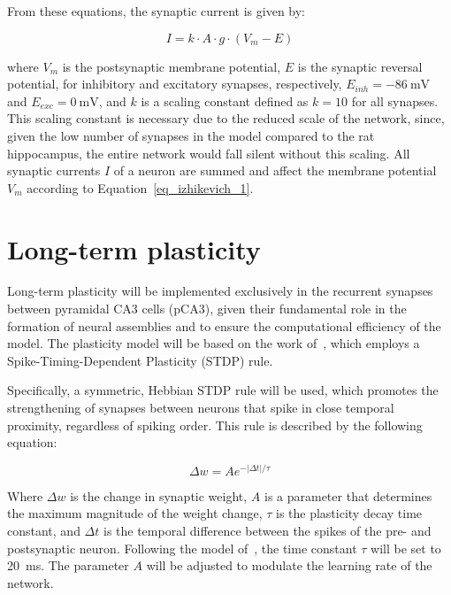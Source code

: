 From these equations, the synaptic current is given by:

\begin{equation}
    \label{eq_tsodyks_I}
    I = k \cdot A \cdot g \cdot (V_m - E)
\end{equation}

where $V_m$ is the postsynaptic membrane potential, $E$ is the synaptic reversal potential, for inhibitory and excitatory
synapses, respectively, $E_{inh} = \SI{-86}{\milli\volt}$ and $E_{exc} = \SI{0}{\milli\volt}$, and $k$ is a scaling constant
defined as $k = 10$ for all synapses. This scaling constant is necessary due to the reduced scale of the network, since, given
the low number of synapses in the model compared to the rat hippocampus, the entire network would fall silent without this
scaling. All synaptic currents $I$ of a neuron are summed and affect the membrane potential $V_m$ according to
Equation~\ref{eq_izhikevich_1}.




\section{Long-term plasticity}

Long-term plasticity will be implemented exclusively in the recurrent synapses between pyramidal CA3 cells (pCA3), given their
fundamental role in the formation of neural assemblies and to ensure the computational efficiency of the model. The plasticity
model will be based on the work of~\textcite{kopsickFormation2024}, which employs a Spike-Timing-Dependent Plasticity (STDP)
rule.

Specifically, a symmetric, Hebbian STDP rule will be used, which promotes the strengthening of synapses between neurons that
spike in close temporal proximity, regardless of spiking order. This rule is described by the following equation:

\begin{equation}
    \label{eq:stdp}
    \Delta w = A e^{-|\Delta t|/\tau}
\end{equation}

Where $\Delta w$ is the change in synaptic weight, $A$ is a parameter that determines the maximum magnitude of the weight
change, $\tau$ is the plasticity decay time constant, and $\Delta t$ is the temporal difference between the spikes of the pre-
and postsynaptic neuron. Following the model of~\parencite{kopsickFormation2024}, the time constant $\tau$ will be set to
\SI{20}{\milli\second}. The parameter $A$ will be adjusted to modulate the learning rate of the network.

